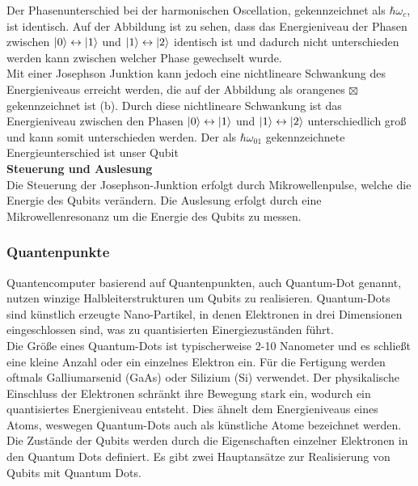 Der Phasenunterschied bei der harmonischen Oscellation, gekennzeichnet als $\hbar\omega_c$, ist identisch. Auf der Abbildung ist zu sehen, dass das Energieniveau der Phasen zwischen $\lvert0\rangle \leftrightarrow \lvert1\rangle$
und $\lvert1\rangle \leftrightarrow \lvert2\rangle$ identisch ist und dadurch nicht unterschieden werden kann zwischen welcher Phase gewechselt wurde.\\

Mit einer Josephson Junktion kann jedoch eine nichtlineare Schwankung des Energieniveaus erreicht werden, die auf der Abbildung als orangenes $\boxtimes$ gekennzeichnet ist (b).
Durch diese nichtlineare Schwankung ist das Energieniveau zwischen den Phasen $\lvert0\rangle \leftrightarrow \lvert1\rangle$ und $\lvert1\rangle \leftrightarrow \lvert2\rangle$ unterschiedlich groß und kann somit unterschieden werden.
Der als $\hbar\omega_{01}$ gekennzeichnete Energieunterschied ist unser Qubit\\

\textbf{Steuerung und Auslesung}\\
Die Steuerung der Josephson-Junktion erfolgt durch Mikrowellenpulse, welche die Energie des Qubits verändern. Die Auslesung erfolgt durch eine Mikrowellenresonanz um die Energie des Qubits zu messen.\\

\subsubsection{Quantenpunkte}
\label{subsub:quantenpunkte}
Quantencomputer basierend auf Quantenpunkten, auch Quantum-Dot genannt, nutzen winzige Halbleiterstrukturen um Qubits zu realisieren.
Quantum-Dots sind künstlich erzeugte Nano-Partikel, in denen Elektronen in drei Dimensionen eingeschlossen sind, was zu quantisierten Einergiezuständen führt.\\

Die Größe eines Quantum-Dots ist typischerweise 2-10 Nanometer und es schließt eine kleine Anzahl oder ein einzelnes Elektron ein.
Für die Fertigung werden oftmals Galliumarsenid (GaAs) oder Silizium (Si) verwendet. Der physikalische Einschluss der Elektronen schränkt ihre
Bewegung stark ein, wodurch ein quantisiertes Energieniveau entsteht. Dies ähnelt dem Energieniveaus eines Atoms, weswegen Quantum-Dots auch als künstliche Atome bezeichnet werden.\\

Die Zustände der Qubits werden durch die Eigenschaften einzelner Elektronen in den Quantum Dots definiert. Es gibt zwei Hauptansätze zur Realisierung von Qubits mit Quantum Dots.\\

